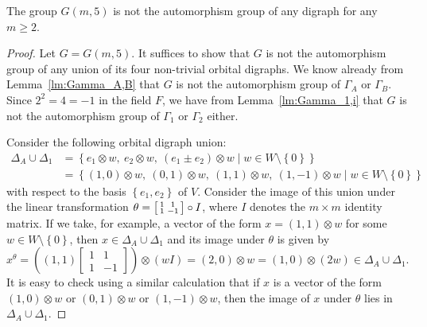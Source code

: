 \begin{theorem} \label{thm:q=5}
The group $G{\left(m, 5 \right)}$ is not the automorphism group of any digraph for any $m \geqslant 2$.
\end{theorem}
\begin{proof}
Let $G = G{\left(m, 5 \right)}$. It suffices to show that $G$ is not the automorphism group of any union of its four non-trivial orbital digraphs. We know already from Lemma~\ref{lm:Gamma_A,B} that $G$ is not the automorphism group of $\Gamma_A$ or $\Gamma_B$. Since $2^2 = 4 = -1$ in the field $F$, we have from Lemma~\ref{lm:Gamma_1,i} that $G$ is not the automorphism group of $\Gamma_1$ or $\Gamma_2$ either.

Consider the following orbital digraph union:
\begin{align*}
\Delta_A \cup \Delta_1 &= \left\{e_1 \otimes w,\ e_2 \otimes w,\ \left(e_1 \pm e_2 \right) \otimes w \mid w \in W \setminus \left\{0 \right\}\right\} \\
&= \left\{\left(1, 0 \right) \otimes w,\ \left(0, 1 \right) \otimes w,\ \left(1, 1 \right) \otimes w,\ \left(1, -1 \right) \otimes w \mid w \in W \setminus \left\{0 \right\}\right\}
\end{align*}
with respect to the basis $\left\{e_1, e_2 \right\}$ of $V$. Consider the image of this union under the linear transformation $\theta = \begin{bsmallmatrix} 1 & 1 \\ 1 & -1 \end{bsmallmatrix} \circ I$, where $I$ denotes the $m \times m$ identity matrix. If we take, for example, a vector of the form $x = \left(1, 1 \right) \otimes w$ for some $w \in W \setminus \left\{0 \right\}$, then $x \in \Delta_A \cup \Delta_1$ and its image under $\theta$ is given by
\begin{displaymath}
x^\theta = \left(\left(1, 1 \right) \begin{bmatrix} 1 & 1 \\ 1 & -1 \end{bmatrix} \right) \otimes \left(wI \right) = \left(2, 0 \right) \otimes w = \left(1, 0 \right) \otimes \left(2w \right) \in \Delta_A \cup \Delta_1.
\end{displaymath}
It is easy to check using a similar calculation that if $x$ is a vector of the form $\left(1, 0 \right) \otimes w$ or $\left(0, 1 \right) \otimes w$ or $\left(1, -1 \right) \otimes w$, then the image of $x$ under $\theta$ lies in $\Delta_A \cup \Delta_1$.


\end{proof}
